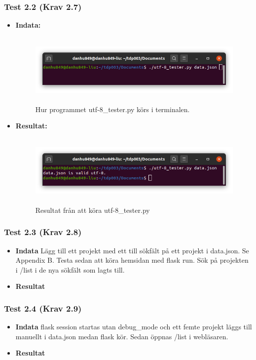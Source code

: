 \documentclass{TDP003mall}
\begin{document}
\subsubsection*{Test 2.2 (Krav 2.7)}
\begin{itemize}
\item[]\textbf{Indata:}
\begin{figure}[h!]
\centerline{\includegraphics[width=\textwidth, height=3.5cm]{../Pictures/utf-8_tester_test.png}}
\caption{Hur programmet utf-8\_tester.py körs i terminalen.\label{fig:}}
\end{figure}
\item[]\textbf{Resultat:}
\begin{figure}[h!]
\centerline{\includegraphics[width=\textwidth, height=3.5cm]{../Pictures/utf-8_tester_valid.png}}
\caption{Resultat från att köra utf-8\_tester.py\label{fig:}}
\end{figure}
\end{itemize}
\subsubsection*{Test 2.3 (Krav 2.8)}
\begin{itemize}%
\item[]\textbf{Indata} Lägg till ett projekt med ett till sökfält på ett projekt i data.json. Se Appendix B. Testa sedan att köra hemsidan med flask run. Sök på projekten i /list i de nya sökfält som lagts till.  
\item[]\textbf{Resultat} 
\end{itemize}
\subsubsection*{Test 2.4 (Krav 2.9)}
\begin{itemize}
\item[]\textbf{Indata} flask session startas utan debug\_mode och ett femte projekt läggs till manuellt i data.json medan flask kör. Sedan öppnas /list i webläsaren.
\item[]\textbf{Resultat} 
\end{itemize}
\end{document}
